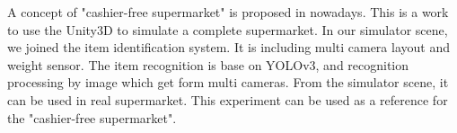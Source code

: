 A concept of "cashier-free supermarket" is proposed in nowadays.
This is a work to use the Unity3D to simulate a complete supermarket.
 In our simulator scene,  we joined the item identification system.
It is including multi camera layout and weight sensor.
The item recognition is base on YOLOv3, and recognition processing by image which get form multi cameras.
From the simulator scene, it can be used in real supermarket.
This experiment can be used as a reference for the "cashier-free supermarket".

